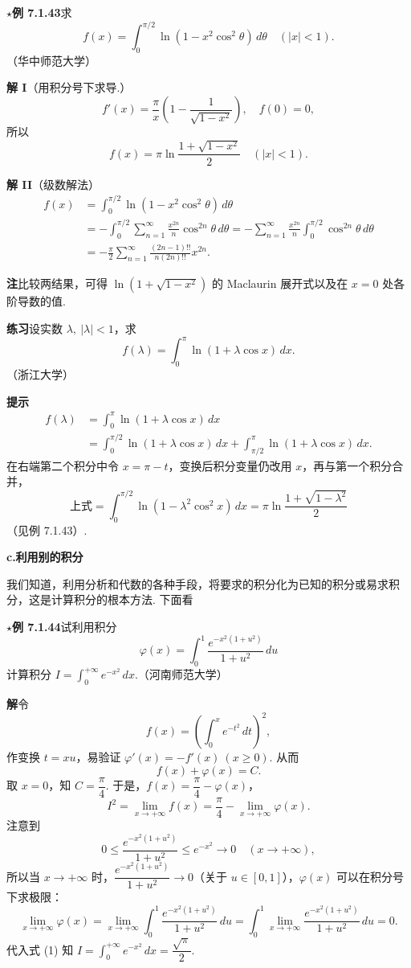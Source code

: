 \documentclass[UTF8, 12pt, fontset=fandol, oneside]{ctexart}
\begin{document}
\noindent\textbf{$\star$例 7.1.43}\quad 求
\[
f(x)=\int_0^{\pi/2}\ln(1-x^2\cos^2\theta)\,d\theta\quad(|x|<1).
\]
（华中师范大学）

\noindent\textbf{解 I}\quad （用积分号下求导.）
\[
f'(x)=\frac{\pi}{x}\left(1-\frac1{\sqrt{1-x^2}}\right),\quad f(0)=0,
\]
所以
\[
f(x)=\pi\ln\frac{1+\sqrt{1-x^2}}2\quad(|x|<1).
\]

\noindent\textbf{解 II}\quad （级数解法）
\[
\begin{aligned}
f(x)
&=\int_0^{\pi/2}\ln(1-x^2\cos^2\theta)\,d\theta\\
&=-\int_0^{\pi/2}\sum_{n=1}^{\infty}\frac{x^{2n}}n\cos^{2n}\theta\,d\theta
=-\sum_{n=1}^{\infty}\frac{x^{2n}}n\int_0^{\pi/2}\cos^{2n}\theta\,d\theta\\
&=-\frac{\pi}{2}\sum_{n=1}^{\infty}\frac{(2n-1)!!}{n(2n)!!}x^{2n}.
\end{aligned}
\]

\noindent\textbf{注}\quad 比较两结果，可得 $\ln(1+\sqrt{1-x^2})$ 的 Maclaurin 展开式以及在 $x=0$ 处各阶导数的值.

\noindent\textbf{练习}\quad 设实数 $\lambda,\ |\lambda|<1$，求
\[
f(\lambda)=\int_0^\pi\ln(1+\lambda\cos x)\,dx.
\]
（浙江大学）

\noindent\textbf{提示}\quad
\[
\begin{aligned}
f(\lambda)
&=\int_0^\pi\ln(1+\lambda\cos x)\,dx\\
&=\int_0^{\pi/2}\ln(1+\lambda\cos x)\,dx
+\int_{\pi/2}^{\pi}\ln(1+\lambda\cos x)\,dx.
\end{aligned}
\]
在右端第二个积分中令 $x=\pi-t$，变换后积分变量仍改用 $x$，再与第一个积分合并，
\[
\text{上式}=\int_0^{\pi/2}\ln(1-\lambda^2\cos^2x)\,dx
=\pi\ln\frac{1+\sqrt{1-\lambda^2}}2
\]
（见例 7.1.43）.

\noindent\textbf{c.\quad 利用别的积分}

我们知道，利用分析和代数的各种手段，将要求的积分化为已知的积分或易求积分，这是计算积分的根本方法. 下面看

\noindent\textbf{$\star$例 7.1.44}\quad 试利用积分
\[
\varphi(x)=\int_0^1\frac{e^{-x^2(1+u^2)}}{1+u^2}\,du
\]
计算积分 $I=\displaystyle\int_0^{+\infty}e^{-x^2}\,dx$.（河南师范大学）

\noindent\textbf{解}\quad 令
\[
f(x)=\left(\int_0^xe^{-t^2}\,dt\right)^2,
\]
作变换 $t=xu$，易验证 $\varphi'(x)=-f'(x)\ (x\ge0)$. 从而
\[
f(x)+\varphi(x)=C.
\]
取 $x=0$，知 $C=\dfrac{\pi}{4}$. 于是，$f(x)=\dfrac{\pi}{4}-\varphi(x)$，
\[
I^2=\lim_{x\to+\infty}f(x)=\frac{\pi}{4}-\lim_{x\to+\infty}\varphi(x).
\tag{1}
\]
注意到
\[
0\le\frac{e^{-x^2(1+u^2)}}{1+u^2}\le e^{-x^2}\to0\quad(x\to+\infty),
\]
所以当 $x\to+\infty$ 时，$\dfrac{e^{-x^2(1+u^2)}}{1+u^2}\to0$（关于 $u\in[0,1]$），$\varphi(x)$ 可以在积分号下求极限：
\[
\lim_{x\to+\infty}\varphi(x)
=\lim_{x\to+\infty}\int_0^1\frac{e^{-x^2(1+u^2)}}{1+u^2}\,du
=\int_0^1\lim_{x\to+\infty}\frac{e^{-x^2(1+u^2)}}{1+u^2}\,du=0.
\]
代入式 (1) 知 $I=\displaystyle\int_0^{+\infty}e^{-x^2}\,dx=\dfrac{\sqrt\pi}{2}$.
\end{document}
